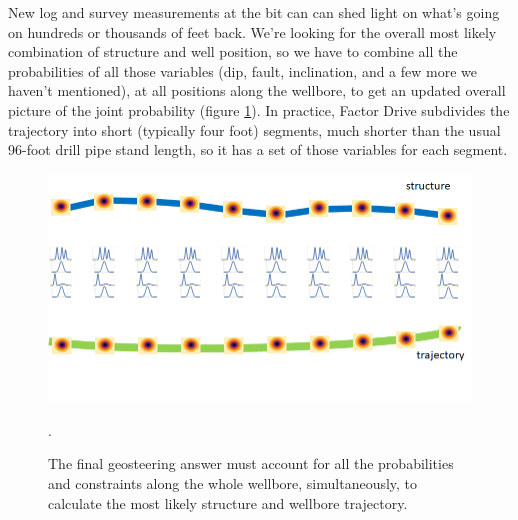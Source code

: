 \documentclass{tufte-handout}
\begin{document}
New log and survey measurements at the bit can can shed light on what's going on hundreds or thousands of feet back. We're looking for the overall most likely combination of structure and
well position, so we have to combine all the probabilities of all those variables (dip, fault,
inclination, and a few more we haven't mentioned), at all positions along the wellbore, to get
an updated overall picture of the joint probability (figure \ref{fig:the-answer}).
In practice, Factor Drive subdivides the trajectory into short (typically four foot) segments,
much shorter than the usual 96-foot drill pipe stand length, so it has a set of those
variables for each segment.

\begin{figure}[h]
    \includegraphics[width=\linewidth]{the-answer.png}
    \caption{
    The final geosteering answer must account for all the probabilities and constraints
    along the whole wellbore, simultaneously, to calculate the most likely structure and
    wellbore trajectory.
    }.
    \label{fig:the-answer}
\end{figure}





\end{document}
